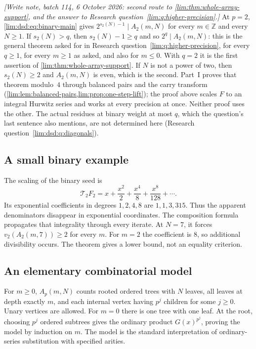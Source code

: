 \documentclass[11pt]{article}
\theoremstyle{definition}
\theoremstyle{remark}
\begin{document}
\emph{[Write note, batch 114, 6 October 2026: second route to \cref{lim:thm:whole-array-support},
and the answer to Research question~\ref{lim:q:higher-precision}.]}
At $p=2$, \eqref{lim:dsd:eq:binary-main} gives $2^{s_2(N)-1}\mid A_2(m,N)$
for every $m\in\mathbb Z$ and every $N\ge1$. If $s_2(N)>q$, then
$s_2(N)-1\ge q$ and so $2^q\mid A_2(m,N)$: this is the general theorem asked
for in Research question~\ref{lim:q:higher-precision}, for every $q\ge1$,
for every $m\ge1$ as asked, and also for $m\le0$. With $q=2$ it is the first
assertion of \cref{lim:thm:whole-array-support}. If $N$ is not a power of
two, then $s_2(N)\ge2$ and $A_2(m,N)$ is even, which is the second. Part~I
proves that theorem modulo~$4$ through balanced pairs and the carry
transform (\cref{lim:lem:balanced-pairs,lim:prop:one-step-lift}); the proof
above scales $F$ to an integral Hurwitz series and works at every precision
at once. Neither proof uses the other. The actual residues at binary weight
at most $q$, which the question's last sentence also mentions, are not
determined here (Research question~\ref{lim:dsd:q:diagonals}).

\subsection{A small binary example}

The scaling of the binary seed is
\[
 \mathcal T_2F_2=x+\frac{x^2}{2}+\frac{x^4}{8}
                    +\frac{x^8}{128}+\cdots.
\]
Its exponential coefficients in degrees $1,2,4,8$ are $1,1,3,315$.
Thus the apparent denominators disappear in exponential coordinates.
The composition formula propagates that integrality through every
iterate. At $N=7$, it forces $v_2(A_2(m,7))\ge2$ for every $m$.
For $m=2$ the coefficient is $8$, so additional divisibility occurs.
The theorem gives a lower bound, not an equality criterion.

\subsection{An elementary combinatorial model}

For $m\ge0$, $A_p(m,N)$ counts rooted ordered trees with $N$ leaves,
all leaves at depth exactly $m$, and each internal vertex having
$p^j$ children for some $j\ge0$. Unary vertices are allowed. For
$m=0$ there is one tree with one leaf. At the root, choosing $p^j$
ordered subtrees gives the ordinary product $G(x)^{p^j}$, proving the
model by induction on $m$. The model is the standard interpretation
of ordinary-series substitution with specified arities.
\end{document}
